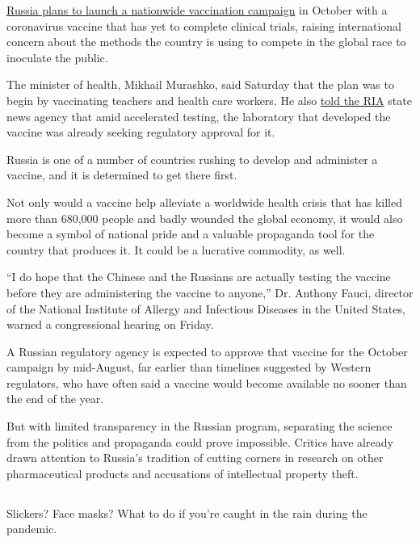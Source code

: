 \href{https://www.nytimes3xbfgragh.onion/2020/08/02/world/europe/russia-trials-vaccine-October.html}{Russia
plans to launch a nationwide vaccination campaign} in October with a
coronavirus vaccine that has yet to complete clinical trials, raising
international concern about the methods the country is using to compete
in the global race to inoculate the public.

The minister of health, Mikhail Murashko, said Saturday that the plan
was to begin by vaccinating teachers and health care workers. He also
\href{https://ria.ru/20200801/1575248763.html}{told the RIA} state news
agency that amid accelerated testing, the laboratory that developed the
vaccine was already seeking regulatory approval for it.

Russia is one of a number of countries rushing to develop and administer
a vaccine, and it is determined to get there first.

Not only would a vaccine help alleviate a worldwide health crisis that
has killed more than 680,000 people and badly wounded the global
economy, it would also become a symbol of national pride and a valuable
propaganda tool for the country that produces it. It could be a
lucrative commodity, as well.

``I do hope that the Chinese and the Russians are actually testing the
vaccine before they are administering the vaccine to anyone,'' Dr.
Anthony Fauci, director of the National Institute of Allergy and
Infectious Diseases in the United States, warned a congressional hearing
on Friday.

A Russian regulatory agency is expected to approve that vaccine for the
October campaign by mid-August, far earlier than timelines suggested by
Western regulators, who have often said a vaccine would become available
no sooner than the end of the year.

But with limited transparency in the Russian program, separating the
science from the politics and propaganda could prove impossible. Critics
have already drawn attention to Russia's tradition of cutting corners in
research on other pharmaceutical products and accusations of
intellectual property theft.

\hypertarget{-9}{%
\subsection{}\label{-9}}

Slickers? Face masks? What to do if you're caught in the rain during the
pandemic.

